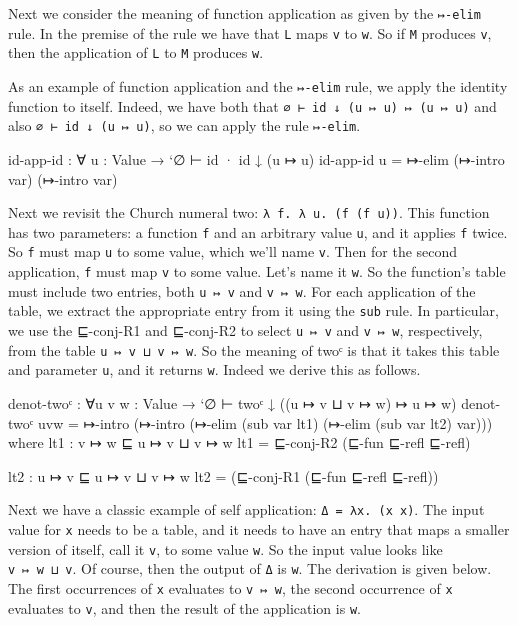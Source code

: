 Next we consider the meaning of function application as given by the
\texttt{↦-elim} rule. In the premise of the rule we have that \texttt{L}
maps \texttt{v} to \texttt{w}. So if \texttt{M} produces \texttt{v},
then the application of \texttt{L} to \texttt{M} produces \texttt{w}.

As an example of function application and the \texttt{↦-elim} rule, we
apply the identity function to itself. Indeed, we have both that
\texttt{∅\ ⊢\ id\ ↓\ (u\ ↦\ u)\ ↦\ (u\ ↦\ u)} and also
\texttt{∅\ ⊢\ id\ ↓\ (u\ ↦\ u)}, so we can apply the rule
\texttt{↦-elim}.

\begin{fence}
\begin{code}
id-app-id : ∀ {u : Value} → `∅ ⊢ id · id ↓ (u ↦ u)
id-app-id {u} = ↦-elim (↦-intro var) (↦-intro var)
\end{code}
\end{fence}

Next we revisit the Church numeral two:
\texttt{λ\ f.\ λ\ u.\ (f\ (f\ u))}. This function has two parameters: a
function \texttt{f} and an arbitrary value \texttt{u}, and it applies
\texttt{f} twice. So \texttt{f} must map \texttt{u} to some value, which
we'll name \texttt{v}. Then for the second application, \texttt{f} must
map \texttt{v} to some value. Let's name it \texttt{w}. So the
function's table must include two entries, both \texttt{u\ ↦\ v} and
\texttt{v\ ↦\ w}. For each application of the table, we extract the
appropriate entry from it using the \texttt{sub} rule. In particular, we
use the ⊑-conj-R1 and ⊑-conj-R2 to select \texttt{u\ ↦\ v} and
\texttt{v\ ↦\ w}, respectively, from the table
\texttt{u\ ↦\ v\ ⊔\ v\ ↦\ w}. So the meaning of twoᶜ is that it takes
this table and parameter \texttt{u}, and it returns \texttt{w}. Indeed
we derive this as follows.

\begin{fence}
\begin{code}
denot-twoᶜ : ∀{u v w : Value} → `∅ ⊢ twoᶜ ↓ ((u ↦ v ⊔ v ↦ w) ↦ u ↦ w)
denot-twoᶜ {u}{v}{w} =
  ↦-intro (↦-intro (↦-elim (sub var lt1) (↦-elim (sub var lt2) var)))
  where lt1 : v ↦ w ⊑ u ↦ v ⊔ v ↦ w
        lt1 = ⊑-conj-R2 (⊑-fun ⊑-refl ⊑-refl)

        lt2 : u ↦ v ⊑ u ↦ v ⊔ v ↦ w
        lt2 = (⊑-conj-R1 (⊑-fun ⊑-refl ⊑-refl))
\end{code}
\end{fence}

Next we have a classic example of self application:
\texttt{Δ\ =\ λx.\ (x\ x)}. The input value for \texttt{x} needs to be a
table, and it needs to have an entry that maps a smaller version of
itself, call it \texttt{v}, to some value \texttt{w}. So the input value
looks like \texttt{v\ ↦\ w\ ⊔\ v}. Of course, then the output of
\texttt{Δ} is \texttt{w}. The derivation is given below. The first
occurrences of \texttt{x} evaluates to \texttt{v\ ↦\ w}, the second
occurrence of \texttt{x} evaluates to \texttt{v}, and then the result of
the application is \texttt{w}.

